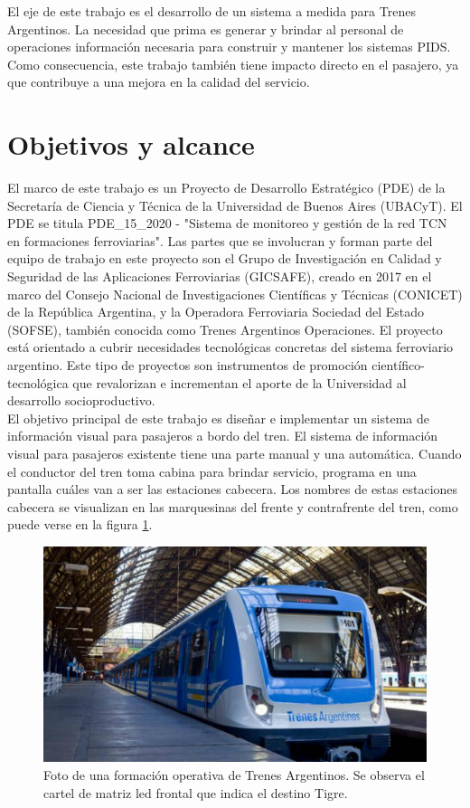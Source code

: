 El eje de este trabajo es el desarrollo de un sistema a medida para Trenes Argentinos. La necesidad que prima es generar y brindar al personal de operaciones información necesaria para construir y mantener los sistemas PIDS. Como consecuencia, este trabajo también tiene impacto directo en el pasajero, ya que contribuye a una mejora en la calidad del servicio.\\


\section{Objetivos y alcance}

El  marco de este trabajo es un Proyecto de Desarrollo Estratégico (PDE) de la Secretaría de Ciencia y Técnica de la Universidad de Buenos Aires (UBACyT). El PDE se titula PDE\_15\_2020 - "Sistema de monitoreo y gestión de la red TCN en formaciones ferroviarias". Las partes que se involucran y forman parte del equipo de trabajo en este proyecto son el Grupo de Investigación en Calidad y Seguridad de las Aplicaciones Ferroviarias (GICSAFE), creado en 2017 en el marco del Consejo Nacional de Investigaciones Científicas y Técnicas (CONICET) de la República Argentina, y la  Operadora Ferroviaria Sociedad del Estado (SOFSE), también conocida como Trenes Argentinos Operaciones. El proyecto está orientado a cubrir necesidades tecnológicas concretas del sistema ferroviario argentino. Este tipo de proyectos son instrumentos de promoción científico-tecnológica que revalorizan e incrementan el aporte de la Universidad al desarrollo socioproductivo.\\

El objetivo principal de este trabajo es diseñar e implementar un sistema de información visual para pasajeros a bordo del tren. El sistema de información visual para pasajeros existente tiene una parte manual y una automática. Cuando el conductor del tren toma cabina para brindar servicio, programa en una pantalla cuáles van a ser las estaciones cabecera. Los nombres de estas estaciones cabecera se visualizan en las marquesinas del frente y contrafrente del tren, como puede verse en la figura \ref{fig:tren}.

\begin{figure}[ht]
	\centering
	\includegraphics[width=1\textwidth]{./Figures/tren.jpg}
	\caption{Foto de una formación operativa de Trenes Argentinos. Se observa el cartel de matriz led frontal que indica el destino Tigre.}
	\label{fig:tren}
\end{figure}


